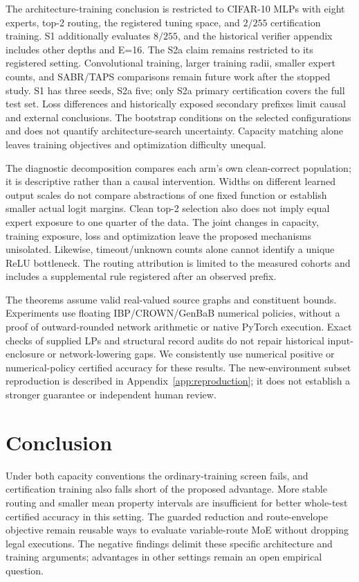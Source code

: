 \documentclass[10pt]{article}
\begin{document}
The architecture-training conclusion is restricted to CIFAR-10 MLPs with
eight experts, top-2 routing, the registered tuning space, and $2/255$
certification training. S1 additionally evaluates $8/255$, and the historical
verifier appendix includes other depths and E=16. The S2a claim remains
restricted to its registered setting. Convolutional training, larger training
radii, smaller expert counts, and SABR/TAPS comparisons remain future work
after the stopped study. S1 has three seeds, S2a five;
only S2a primary certification covers the full test set. Loss differences and
historically exposed secondary prefixes limit causal and external conclusions.
The bootstrap conditions on the selected configurations and does not quantify
architecture-search uncertainty. Capacity matching alone leaves training
objectives and optimization difficulty unequal.

The diagnostic decomposition compares each arm's own clean-correct population;
it is descriptive rather than a causal intervention. Widths on different
learned output scales do not compare abstractions of one fixed function or
establish smaller actual logit margins. Clean top-2 selection also does not
imply equal expert exposure to one quarter of the data. The joint changes in
capacity, training exposure, loss and optimization leave the proposed mechanisms
unisolated. Likewise, timeout/unknown counts alone cannot identify a unique
ReLU bottleneck. The routing attribution is limited to the measured cohorts
and includes a supplemental rule registered after an observed prefix.

The theorems assume valid real-valued source graphs and constituent bounds.
Experiments use floating IBP/CROWN/GenBaB numerical policies, without a proof
of outward-rounded network arithmetic or native PyTorch execution. Exact
checks of supplied LPs and structural record audits do not repair historical
input-enclosure or network-lowering gaps. We consistently use numerical
positive or numerical-policy certified accuracy for these results. The
new-environment subset reproduction is described in Appendix~\ref{app:reproduction};
it does not establish a stronger guarantee or independent human review.

\section{Conclusion}
Under both capacity conventions the ordinary-training screen fails, and
certification training also falls short of the proposed advantage. More stable
routing and smaller mean property intervals are insufficient for better
whole-test certified accuracy in this setting. The guarded reduction and
route-envelope objective remain reusable ways to evaluate variable-route
MoE without dropping legal executions. The negative findings delimit these
specific architecture and training arguments; advantages in other settings
remain an open empirical question.
\end{document}
